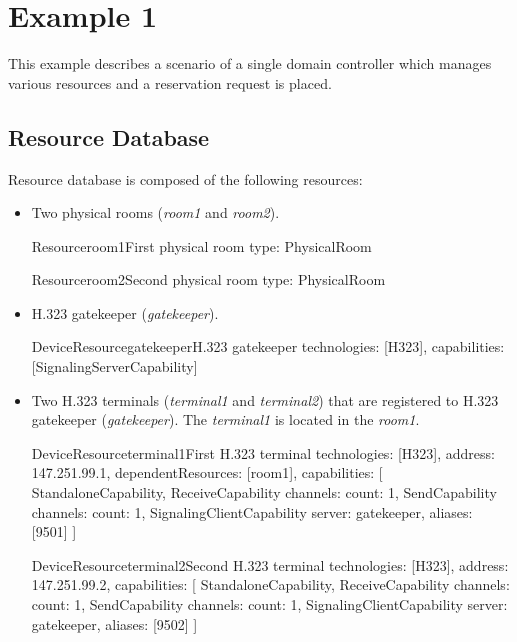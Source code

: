 \section{Example 1}

This example describes a scenario of a single domain controller which manages various resources and a reservation request is placed.

\subsection{Resource Database}

Resource database is composed of the following resources:
\begin{itemize}
\item Two physical rooms (\emph{room1} and \emph{room2}).

\begin{ResourceExample}{Resource}{room1}{First physical room}
type: PhysicalRoom
\end{ResourceExample}

\begin{ResourceExample}{Resource}{room2}{Second physical room}
type: PhysicalRoom
\end{ResourceExample}

\item H.323 gatekeeper (\emph{gatekeeper}).

\begin{ResourceExample}{DeviceResource}{gatekeeper}{H.323 gatekeeper}
technologies: [H323], 
capabilities: [SignalingServerCapability]
\end{ResourceExample}

\item Two H.323 terminals (\emph{terminal1} and \emph{terminal2}) that are
  registered to H.323 gatekeeper (\emph{gatekeeper}). The \emph{terminal1} is
  located in the \emph{room1}.
  
\begin{ResourceExample}{DeviceResource}{terminal1}{First H.323 terminal}
technologies: [H323], 
address: 147.251.99.1,
dependentResources: [room1],
capabilities: [
  StandaloneCapability,
  ReceiveCapability {channels: {count: 1}},
  SendCapability {channels: {count: 1}},
  SignalingClientCapability {server: gatekeeper, aliases: [9501]}
]
\end{ResourceExample}

\begin{ResourceExample}{DeviceResource}{terminal2}{Second H.323 terminal}
technologies: [H323], 
address: 147.251.99.2,
capabilities: [
  StandaloneCapability,
  ReceiveCapability {channels: {count: 1}},
  SendCapability {channels: {count: 1}},
  SignalingClientCapability {server: gatekeeper, aliases: [9502]}
]
\end{ResourceExample}


\end{itemize}
